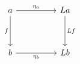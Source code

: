 \[\begin{tikzcd}
	a && La \\
	\\
	b && Lb
	\arrow["{\eta_{a}}", from=1-1, to=1-3]
	\arrow["{\eta_{b}}"', from=3-1, to=3-3]
	\arrow["f"', from=1-1, to=3-1]
	\arrow["Lf", from=1-3, to=3-3]
\end{tikzcd}\]